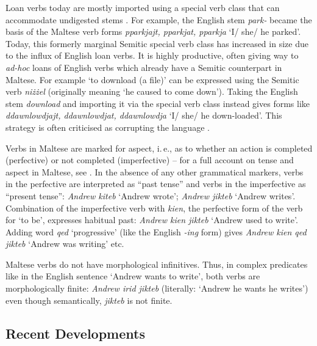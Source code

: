 \begin{multicols}{2}
Loan verbs today are mostly imported using a special verb class that can accommodate undigested stems \cite{Mifsud:1995}. For example, the English stem \emph{park-} became the basis of the Maltese verb forms \emph{pparkjajt, pparkjat, pparkja} `I/ she/ he parked'. Today, this formerly marginal Semitic special verb class has increased in size due to the influx of English loan verbs. It is highly productive, often giving way to \emph{ad-hoc} loans of English verbs which already have a Semitic counterpart in Maltese. For example `to download (a file)' can be expressed using the Semitic verb \emph{niżżel} (originally meaning `he caused to come down'). Taking the English stem \emph{download} and importing it via the special verb class instead gives forms like \emph{ddawnlowdjajt, ddawnlowdjat, ddawnlowdja} `I/ she/ he down-loaded'. This strategy is often criticised as corrupting the language \cite{Fabri:2011a}.


Verbs in Maltese are marked for aspect, i.\,e., as to whether an action is completed (perfective) or not completed (imperfective) -- for a full account on tense and aspect in Maltese, see \cite{Fabri:1995, Ebert:2000}. In the absence of any other grammatical markers, verbs in the perfective are interpreted as ``past tense'' and verbs in the imperfective as ``present tense'': \emph{Andrew kiteb} `Andrew wrote'; \emph{Andrew jikteb} `Andrew writes'. Combination of the imperfective verb with \emph{kien}, the perfective form of the verb for `to be', expresses habitual past: \emph{Andrew kien jikteb} `Andrew used to write'. Adding word \emph{qed} `progressive' (like the English \emph{-ing} form) gives \emph{Andrew kien qed jikteb} `Andrew was writing' etc.

Maltese verbs do not have morphological infinitives. Thus, in complex predicates like in the English sentence `Andrew wants to write', both verbs are morphologically finite: \emph{Andrew irid jikteb} (literally: `Andrew he wants he writes') even though semantically, \emph{jikteb} is not finite.  

\subsection{Recent Developments}


\end{multicols}
